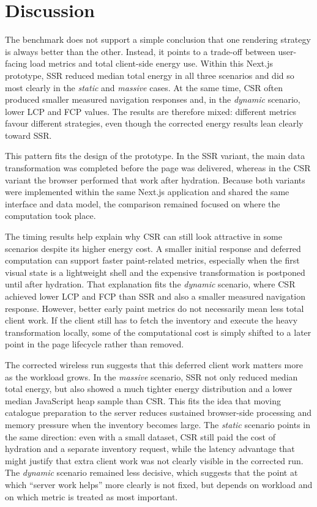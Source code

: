 \section{Discussion}

The benchmark does not support a simple conclusion that one rendering strategy is always better than the other. Instead, it points to a trade-off between user-facing load metrics and total client-side energy use. Within this Next.js prototype, SSR reduced median total energy in all three scenarios and did so most clearly in the \textit{static} and \textit{massive} cases. At the same time, CSR often produced smaller measured navigation responses and, in the \textit{dynamic} scenario, lower LCP and FCP values. The results are therefore mixed: different metrics favour different strategies, even though the corrected energy results lean clearly toward SSR.

This pattern fits the design of the prototype. In the SSR variant, the main data transformation was completed before the page was delivered, whereas in the CSR variant the browser performed that work after hydration. Because both variants were implemented within the same Next.js application and shared the same interface and data model, the comparison remained focused on where the computation took place.

The timing results help explain why CSR can still look attractive in some scenarios despite its higher energy cost. A smaller initial response and deferred computation can support faster paint-related metrics, especially when the first visual state is a lightweight shell and the expensive transformation is postponed until after hydration. That explanation fits the \textit{dynamic} scenario, where CSR achieved lower LCP and FCP than SSR and also a smaller measured navigation response. However, better early paint metrics do not necessarily mean less total client work. If the client still has to fetch the inventory and execute the heavy transformation locally, some of the computational cost is simply shifted to a later point in the page lifecycle rather than removed.

The corrected wireless run suggests that this deferred client work matters more as the workload grows. In the \textit{massive} scenario, SSR not only reduced median total energy, but also showed a much tighter energy distribution and a lower median JavaScript heap sample than CSR. This fits the idea that moving catalogue preparation to the server reduces sustained browser-side processing and memory pressure when the inventory becomes large. The \textit{static} scenario points in the same direction: even with a small dataset, CSR still paid the cost of hydration and a separate inventory request, while the latency advantage that might justify that extra client work was not clearly visible in the corrected run. The \textit{dynamic} scenario remained less decisive, which suggests that the point at which ``server work helps'' more clearly is not fixed, but depends on workload and on which metric is treated as most important.

